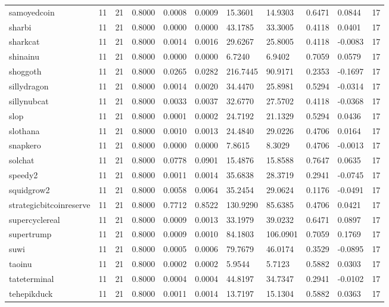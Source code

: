 \begin{table}[htbp]
\begin{tabular}{lllllllllll}
samoyedcoin & 11 & 21 & 0.8000 & 0.0008 & 0.0009 & 15.3601 & 14.9303 & 0.6471 & 0.0844 & 17 \\
sharbi & 11 & 21 & 0.8000 & 0.0000 & 0.0000 & 43.1785 & 33.3005 & 0.4118 & 0.0401 & 17 \\
sharkcat & 11 & 21 & 0.8000 & 0.0014 & 0.0016 & 29.6267 & 25.8005 & 0.4118 & -0.0083 & 17 \\
shinainu & 11 & 21 & 0.8000 & 0.0000 & 0.0000 & 6.7240 & 6.9402 & 0.7059 & 0.0579 & 17 \\
shoggoth & 11 & 21 & 0.8000 & 0.0265 & 0.0282 & 216.7445 & 90.9171 & 0.2353 & -0.1697 & 17 \\
sillydragon & 11 & 21 & 0.8000 & 0.0014 & 0.0020 & 34.4470 & 25.8981 & 0.5294 & -0.0314 & 17 \\
sillynubcat & 11 & 21 & 0.8000 & 0.0033 & 0.0037 & 32.6770 & 27.5702 & 0.4118 & -0.0368 & 17 \\
slop & 11 & 21 & 0.8000 & 0.0001 & 0.0002 & 24.7192 & 21.1329 & 0.5294 & 0.0436 & 17 \\
slothana & 11 & 21 & 0.8000 & 0.0010 & 0.0013 & 24.4840 & 29.0226 & 0.4706 & 0.0164 & 17 \\
snapkero & 11 & 21 & 0.8000 & 0.0000 & 0.0000 & 7.8615 & 8.3029 & 0.4706 & -0.0013 & 17 \\
solchat & 11 & 21 & 0.8000 & 0.0778 & 0.0901 & 15.4876 & 15.8588 & 0.7647 & 0.0635 & 17 \\
speedy2 & 11 & 21 & 0.8000 & 0.0011 & 0.0014 & 35.6838 & 28.3719 & 0.2941 & -0.0745 & 17 \\
squidgrow2 & 11 & 21 & 0.8000 & 0.0058 & 0.0064 & 35.2454 & 29.0624 & 0.1176 & -0.0491 & 17 \\
strategicbitcoinreserve & 11 & 21 & 0.8000 & 0.7712 & 0.8522 & 130.9290 & 85.6385 & 0.4706 & 0.0421 & 17 \\
supercyclereal & 11 & 21 & 0.8000 & 0.0009 & 0.0013 & 33.1979 & 39.0232 & 0.6471 & 0.0897 & 17 \\
supertrump & 11 & 21 & 0.8000 & 0.0009 & 0.0010 & 84.1803 & 106.0901 & 0.7059 & 0.1769 & 17 \\
suwi & 11 & 21 & 0.8000 & 0.0005 & 0.0006 & 79.7679 & 46.0174 & 0.3529 & -0.0895 & 17 \\
taoinu & 11 & 21 & 0.8000 & 0.0002 & 0.0002 & 5.9544 & 5.7123 & 0.5882 & 0.0303 & 17 \\
tateterminal & 11 & 21 & 0.8000 & 0.0004 & 0.0004 & 44.8197 & 34.7347 & 0.2941 & -0.0102 & 17 \\
tehepikduck & 11 & 21 & 0.8000 & 0.0011 & 0.0014 & 13.7197 & 15.1304 & 0.5882 & 0.0363 & 17 \\

\end{tabular}
\end{table}
